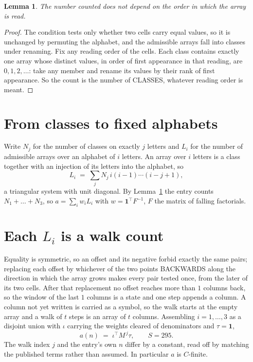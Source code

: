 \documentclass[11pt,a4paper]{article}
\theoremstyle{plain}
\newtheorem{lemma}[theorem]{Lemma}
\theoremstyle{definition}
\begin{document}
\begin{lemma}\label{lem:order}
The number counted does not depend on the order in which the array is read.
\end{lemma}

\begin{proof}
The condition tests only whether two cells carry equal values, so it is unchanged by permuting
the alphabet, and the admissible arrays fall into classes under renaming. Fix any reading order
of the cells. Each class contains exactly one array whose distinct values, in order of first
appearance in that reading, are $0,1,2,\dots$: take any member and rename its values by their
rank of first appearance. So the count is the number of CLASSES, whatever reading order is
meant.
\end{proof}

\section{From classes to fixed alphabets}

Write $N_j$ for the number of classes on exactly $j$ letters and $L_i$ for the number of
admissible arrays over an alphabet of $i$ letters. An array over $i$ letters is a class together
with an injection of its letters into the alphabet, so
\[
L_i\;=\;\sum_j N_j\,i(i-1)\cdots(i-j+1),
\]
a triangular system with unit diagonal. By Lemma~\ref{lem:order} the entry counts
$N_1+\dots+N_{3}$, so $a=\sum_i w_iL_i$ with $w=\mathbf{1}^{\!\top}F^{-1}$, $F$ the
matrix of falling factorials.

\section{Each $L_i$ is a walk count}

Equality is symmetric, so an offset and its negative forbid exactly the same pairs; replacing
each offset by whichever of the two points BACKWARDS along the direction in which the array
grows makes every pair tested once, from the later of its two cells. After that replacement no
offset reaches more than $1$ columns back, so the window of the last $1$
columns is a state and one step appends a column. A column not yet written is
carried as a symbol, so the walk starts at the empty array and a walk of $t$ steps is an array
of $t$ columns. Assembling $i=1,\dots,3$ as a disjoint union with $\iota$ carrying the
weights cleared of denominators and $\tau=\mathbf{1}$,
\[
a(n)\;=\;\iota^{\!\top}M^{\,j}\tau ,\qquad S=295.
\]
The walk index $j$ and the entry's own $n$ differ by a constant, read off by matching the
published terms rather than assumed. In particular $a$ is $C$-finite.
\end{document}
